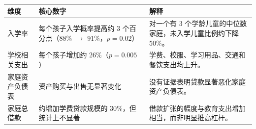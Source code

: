 \begin{table}
  \centering
  \scriptsize
  \begin{tabular}{p{3.1cm} p{2.8cm} p{5.4cm}}
    \toprule
    \textbf{维度} & \textbf{核心数字} & \textbf{解释} \\
    \midrule
    入学率 & 每个孩子入学概率提高约 3 个百分点（88\% $\rightarrow$ 91\%，$p=0.02$） & 对一个有 3 个学龄儿童的中位数家庭，未入学儿童比例约下降 50\%。 \\
    学校相关支出 & 每个孩子增加约 26\%（$p=0.005$） & 学费、校服、学习用品、交通和餐饮支出均上升。 \\
    家庭资产负债表 & 资产购买与出售无显著变化 & 没有证据表明贷款显著恶化家庭资产负债表。 \\
    家庭总借款 & 约增加学费贷款规模的 30\%，但统计上不显著 & 借款扩张的幅度与教育支出增加相当，而非明显推高杠杆。 \\
    \bottomrule
  \end{tabular}
\end{table}
